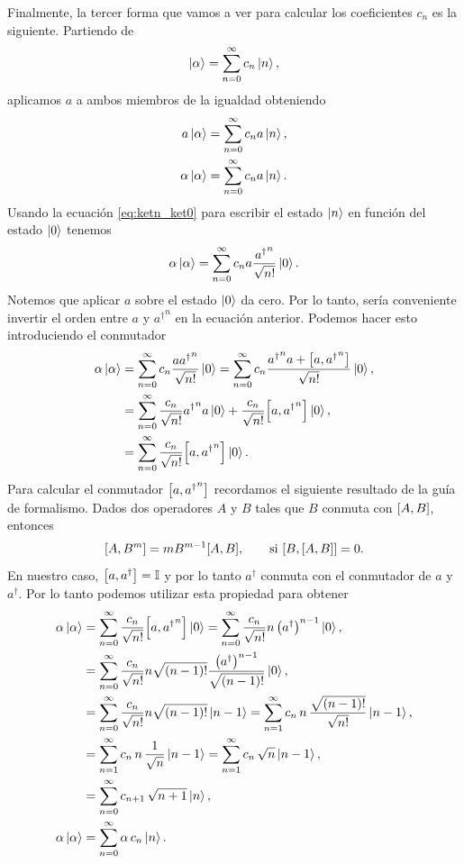 \documentclass[10pt, a4paper]{article}
\numberwithin{equation}{subsection}
\begin{document}
\bigbreak

Finalmente, la tercer forma que vamos a ver para calcular los coeficientes
$c_n$ es la siguiente. Partiendo de
\begin{equation}
  \ket{\alpha} = \sum_{n=0}^{\infty} c_n \ket{n},
\end{equation}
aplicamos $a$ a ambos miembros de la igualdad obteniendo
\begin{align}
  a\ket{\alpha} &= \sum_{n=0}^{\infty} c_n a\ket{n}, \\
  \alpha\ket{\alpha} &= \sum_{n=0}^{\infty} c_n a\ket{n}.
\end{align}
Usando la ecuación \eqref{eq:ketn_ket0} para escribir el estado $\ket{n}$ en
función del estado $\ket{0}$ tenemos
\begin{equation}
  \alpha\ket{\alpha} = \sum_{n=0}^{\infty} c_n
    a\frac{{a^\dagger}^n}{\sqrt{n!}} \ket{0}.
\end{equation}
Notemos que aplicar $a$ sobre el estado $\ket{0}$ da cero. Por lo tanto, sería
conveniente invertir el orden entre $a$ y ${a^\dagger}^n$ en la ecuación
anterior. Podemos hacer esto introduciendo el conmutador
\begin{align}
  \alpha\ket{\alpha} &= \sum_{n=0}^{\infty} c_n
    \frac{{aa^\dagger}^n}{\sqrt{n!}} \ket{0}
    = \sum_{n=0}^{\infty} c_n \frac{{a^\dagger}^n a +
    \comm{a}{{a^\dagger}^n}}{\sqrt{n!}} \ket{0}, \\
  &= \sum_{n=0}^{\infty} \frac{c_n}{\sqrt{n!}} {a^\dagger}^n a\ket{0} +
    \frac{c_n}{\sqrt{n!}} \comm{a}{{a^\dagger}^n}\ket{0}, \\
  &= \sum_{n=0}^{\infty} \frac{c_n}{\sqrt{n!}} \comm{a}{{a^\dagger}^n}\ket{0}.
\end{align}
Para calcular el conmutador $\comm{a}{{a^\dagger}^n}$ recordamos el siguiente
resultado de la guía de formalismo. Dados dos operadores $A$ y $B$ tales que
$B$ conmuta con $\comm{A}{B}$, entonces
\begin{equation}
  \comm{A}{B^m} = mB^{m-1}\comm{A}{B}, \qquad \text{si }\comm{B}{\comm{A}{B}} =
    0.
\end{equation}
En nuestro caso, $\comm{a}{a^\dagger} = \Id$ y por lo tanto $a^\dagger$ conmuta
con el conmutador de $a$ y $a^\dagger$. Por lo tanto podemos utilizar esta
propiedad para obtener
\begin{align}
  \alpha\ket{\alpha} &= \sum_{n=0}^{\infty} \frac{c_n}{\sqrt{n!}}
    \comm{a}{{a^\dagger}^n}\ket{0} = \sum_{n=0}^{\infty} \frac{c_n}{\sqrt{n!}}
    n\left(a^\dagger\right)^{n-1}\ket{0}, \\
  &= \sum_{n=0}^{\infty} \frac{c_n}{\sqrt{n!}}
    n\sqrt{(n-1)!} \frac{\left(a^\dagger\right)^{n-1}}{\sqrt{(n-1)!}} \ket{0},
    \\
  &= \sum_{n=0}^{\infty} \frac{c_n}{\sqrt{n!}} n\sqrt{(n-1)!} \ket{n-1}
    = \sum_{n=1}^{\infty} c_n\,n\,\frac{\sqrt{(n-1)!}}{\sqrt{n!}} \ket{n-1}, \\
  &= \sum_{n=1}^{\infty} c_n\,n\,\frac{1}{\sqrt{n}} \ket{n-1}
    = \sum_{n=1}^{\infty} c_n\,\sqrt{n} \ket{n-1}, \\
  &= \sum_{n=0}^{\infty} c_{n+1}\,\sqrt{n+1} \ket{n}, \\
  \alpha\ket{\alpha} &= \sum_{n=0}^{\infty} \alpha\,c_{n}\ket{n}.
\end{align}
\end{document}
